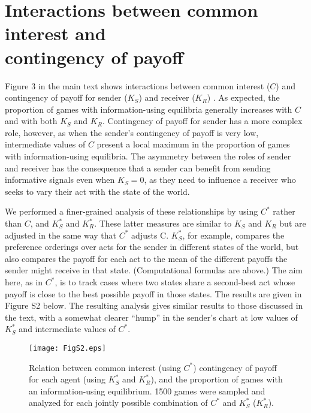 \documentclass{article}
\begin{document}
\section*{Interactions between common interest and \\contingency of
payoff}

Figure 3 in the main text shows interactions between common
interest ($C$) and contingency of payoff for sender ($K_S$) and receiver
($K_R$) . As expected, the proportion of games with information-using
equilibria generally increases with $C$ and with both $K_S$ and $K_R$.
Contingency of payoff for sender has a more complex role, however,
as when the sender's contingency of payoff is very low, intermediate
values of $C$ present a local maximum in the proportion of games with
 information-using equilibria. The asymmetry between the roles of
sender and receiver has the consequence that a sender can benefit
from sending informative signals even when $K_S=0$, as they need to
influence a receiver who seeks to vary their act with the state of the
world.

We performed a finer-grained analysis of these relationships by
using $C^*$ rather than $C$, and $K^*_S$ and $K^*_R$. These latter measures are
similar to $K_S$ and $K_R$ but are adjusted in the same way that $C^*$ adjusts
C. $K^*_S$, for example, compares the preference orderings over acts for
the sender in different states of the world, but also compares the
payoff for each act to the mean of the different payoffs the sender might receive in that
state. (Computational formulas are above.) The aim here, as in $C^*$, is
to track cases where two states share a second-best act whose payoff
is close to the best possible payoff in those states. The results are
given in Figure S2 below. The resulting analysis gives similar results to
those discussed in the text, with a somewhat clearer ``hump'' in the
sender's chart at low values of $K^*_S$ and intermediate values of $C^*$.

\begin{figure}[!ht]
\begin{center}
    \texttt{[image: FigS2.eps]}
\end{center}
\caption
    {Relation between common interest (using $C^*$)
contingency of payoff for each agent (using $K^*_S$ and
$K^*_R$), and the proportion of games with
an information-using equilibrium. 1500 games were sampled and analyzed for each
jointly possible combination of $C^*$ and $K^*_S$ ($K^*_R$).}
\label{Figure_label}
\end{figure}




\end{document}
